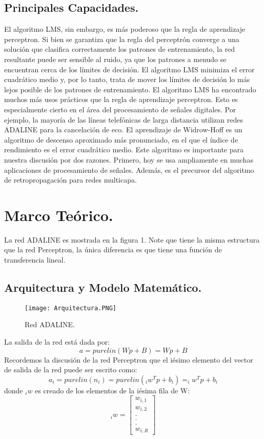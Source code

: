\documentclass[]{article}
\begin{document}
	\subsection{Principales Capacidades.}
	El algoritmo LMS, sin embargo, es más poderoso que la regla de aprendizaje perceptron. Si bien se garantiza que la regla del perceptrón converge a una solución que clasifica correctamente los patrones de entrenamiento, la red resultante puede ser sensible al ruido, ya que los patrones a menudo se encuentran cerca de los límites de decisión. El algoritmo LMS minimiza el error cuadrático medio y, por lo tanto, trata de mover los límites de decisión lo más lejos posible de los patrones de entrenamiento. El algoritmo LMS ha encontrado muchos más usos prácticos que la regla de aprendizaje perceptron. Esto es especialmente cierto en el área del procesamiento de señales digitales. Por ejemplo, la mayoría de las líneas telefónicas de larga distancia utilizan redes ADALINE para la cancelación de eco.
	El aprendizaje de Widrow-Hoff es un algoritmo de descenso aproximado más pronunciado, en el que el índice de rendimiento es el error cuadrático medio. Este algoritmo es importante para nuestra discusión por dos razones. Primero, hoy se usa ampliamente en muchas aplicaciones de procesamiento de señales. Además, es el precursor del algoritmo de retropropagación para redes multicapa.
	\newpage
	\section{Marco Teórico.}
	La red ADALINE es mostrada en la figura 1. Note que tiene la misma estructura que la red Perceptron, la única diferencia es que tiene una función de transferencia lineal.
	\subsection{Arquitectura y Modelo Matemático.}
	\begin{figure}[H]
		\centering
		\texttt{[image: Arquitectura.PNG]}
		\caption{Red ADALINE.}
	\end{figure}
	La salida de la red está dada por:
	\begin{equation}
		a = purelin(Wp + B) = Wp + B
	\end{equation}
	Recordemos la discusión de la red Perceptron que el iésimo elemento del vector de salida de la red puede ser escrito como:
	\begin{equation}
	a_i = purelin(n_i) = purelin(_iw^Tp + b_i) = _iw^Tp + b_i
	\end{equation}
	donde $_iw$ es creado de los elementos de la iésima fila de W:
	\begin{equation}
	_i w = \begin{bmatrix}
	w_{i,1}\\w_{i,2}\\.\\.\\.\\w_{i,R}
	\end{bmatrix}
	\end{equation}	
	\newpage
\end{document}
